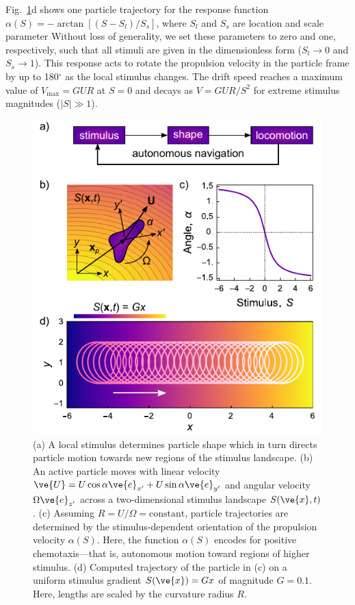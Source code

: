 Fig.\ \ref{fig:1}d shows one particle trajectory for the response function $\alpha(S) = -\arctan[(S-S_l)/S_s]$, where $S_l$ and $S_s$ are location and scale parameter   Without loss of generality, we set these parameters to zero and one, respectively, such that all stimuli are given in the dimensionless form ($S_l\rightarrow0$ and $S_s\rightarrow1$).  This response acts to rotate the propulsion velocity in the particle frame by up to 180$^{\circ}$ as the local stimulus changes.  The drift speed reaches a maximum value of $V_{\max}=G U R$ at $S=0$ and decays as $V=G U R / S^2$ for extreme stimulus magnitudes ($\lvert S \rvert \gg 1$).

\begin{figure}[h!]
     \centering
     \includegraphics{figures/4_1.pdf}
     \caption{
     (a) A local stimulus determines particle shape which in turn directs particle motion towards new regions of the stimulus landscape.
     (b) An active particle moves with linear velocity $\ve{U}= U\cos\alpha \ve{e}_{x'} + U\sin\alpha \ve{e}_{y'}$ and angular velocity $\Omega\ve{e}_{z'}$ across a two-dimensional stimulus landscape $S(\ve{x},t)$.  
     (c) Assuming $R=U/\Omega=\text{constant}$, particle trajectories are determined by the stimulus-dependent orientation of the propulsion velocity $\alpha(S)$. Here, the function $\alpha(S)$ encodes for positive chemotaxis---that is, autonomous motion toward regions of higher stimulus. 
     (d) Computed trajectory of the particle in (c) on a uniform stimulus gradient $S(\ve{x})=G x$ of magnitude $G=0.1$. Here, lengths are scaled by the curvature radius $R$.}
     \label{fig:1}
 \end{figure}


